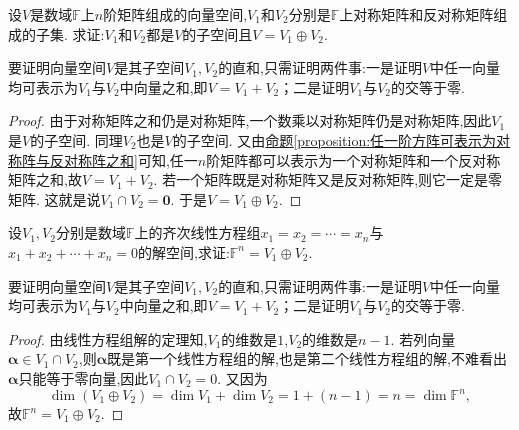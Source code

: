 \documentclass[lang=cn,newtx,10pt,scheme=chinese]{elegantbook}
\begin{document}
\begin{proposition}\label{proposition:矩阵空间可以分解为对称和反称矩阵空间的直和}
设\(V\)是数域\(\mathbb{F}\)上\(n\)阶矩阵组成的向量空间,\(V_1\)和\(V_2\)分别是\(\mathbb{F}\)上对称矩阵和反对称矩阵组成的子集. 求证:\(V_1\)和\(V_2\)都是\(V\)的子空间且\(V = V_1\oplus V_2\).
\end{proposition}
\begin{note}
要证明向量空间\(V\)是其子空间\(V_1,V_2\)的直和,只需证明两件事:一是证明\(V\)中任一向量均可表示为\(V_1\)与\(V_2\)中向量之和,即\(V = V_1 + V_2\)；二是证明\(V_1\)与\(V_2\)的交等于零.
\end{note}
\begin{proof}
由于对称矩阵之和仍是对称矩阵,一个数乘以对称矩阵仍是对称矩阵,因此\(V_1\)是\(V\)的子空间. 同理\(V_2\)也是\(V\)的子空间. 又由\hyperref[proposition:任一阶方阵可表示为对称阵与反对称阵之和]{命题\ref{proposition:任一阶方阵可表示为对称阵与反对称阵之和}}可知,任一\(n\)阶矩阵都可以表示为一个对称矩阵和一个反对称矩阵之和,故\(V = V_1 + V_2\). 若一个矩阵既是对称矩阵又是反对称矩阵,则它一定是零矩阵. 这就是说\(V_1\cap V_2 =\mathbf{0}\). 于是\(V = V_1\oplus V_2\). 
\end{proof}

\begin{example}
设\(V_1,V_2\)分别是数域\(\mathbb{F}\)上的齐次线性方程组\(x_1 = x_2=\cdots = x_n\)与\(x_1 + x_2+\cdots + x_n = 0\)的解空间,求证:\(\mathbb{F}^n = V_1\oplus V_2\).
\end{example}
\begin{note}
要证明向量空间\(V\)是其子空间\(V_1,V_2\)的直和,只需证明两件事:一是证明\(V\)中任一向量均可表示为\(V_1\)与\(V_2\)中向量之和,即\(V = V_1 + V_2\)；二是证明\(V_1\)与\(V_2\)的交等于零.
\end{note}
\begin{proof}
由线性方程组解的定理知,\(V_1\)的维数是\(1\),\(V_2\)的维数是\(n - 1\). 若列向量\(\boldsymbol{\alpha}\in V_1\cap V_2\),则\(\boldsymbol{\alpha}\)既是第一个线性方程组的解,也是第二个线性方程组的解,不难看出\(\boldsymbol{\alpha}\)只能等于零向量,因此\(V_1\cap V_2 = 0\). 又因为
\[
\dim(V_1\oplus V_2)=\dim V_1+\dim V_2=1+(n - 1)=n=\dim\mathbb{F}^n,
\]
故\(\mathbb{F}^n = V_1\oplus V_2\).
\end{proof}
\end{document}
